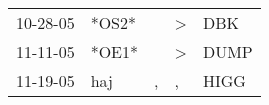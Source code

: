 \begin{supertabular}{lllll}
 10-28-05 &  *OS2* &    &  \textgreater &   DBK \\
 11-11-05 &  *OE1* &    &  \textgreater &  DUMP \\
 11-19-05 &    haj &  , &             , &  HIGG \\
\end{supertabular}
